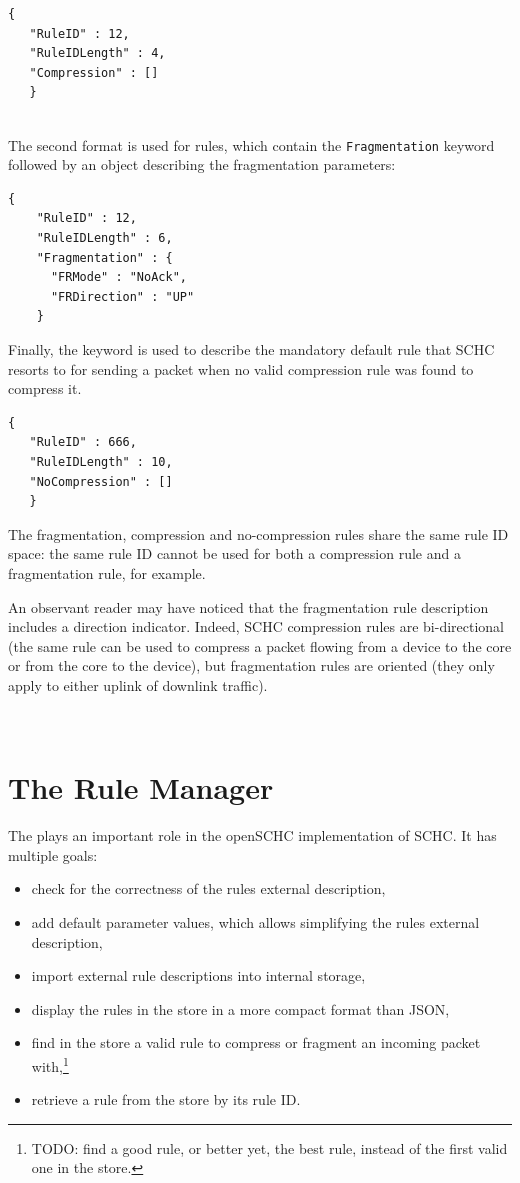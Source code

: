 \begin{lstlisting}[backgroundcolor=\color{yellow}]
   {
   "RuleID" : 12,
   "RuleIDLength" : 4,
   "Compression" : []
   }
   
\end{lstlisting}

The second format is used for  rules, which contain the \texttt{Fragmentation} keyword followed by an object describing the fragmentation parameters:

\begin{lstlisting}[backgroundcolor=\color{yellow}]
    {
    "RuleID" : 12,
    "RuleIDLength" : 6,
    "Fragmentation" : {
      "FRMode" : "NoAck",
      "FRDirection" : "UP"
    }
\end{lstlisting}

Finally, the  keyword is used to describe the mandatory default rule that SCHC resorts to for sending a packet when no valid compression rule was found to compress it.


\begin{lstlisting}[backgroundcolor=\color{yellow}]
   {
   "RuleID" : 666,
   "RuleIDLength" : 10,
   "NoCompression" : []
   }
\end{lstlisting}

The fragmentation, compression and no-compression rules share the same rule ID space: the same rule ID cannot be used for both a compression rule and a fragmentation rule, for example. 

An observant reader may have noticed that the fragmentation rule description includes a direction indicator. 
Indeed, SCHC compression rules are bi-directional (the same rule can be used to compress a packet flowing from a device to the core or from the core to the device), but fragmentation rules are oriented (they only apply to either uplink of downlink traffic).  

~



\section{The Rule Manager}

The  plays an important role in the openSCHC implementation of SCHC. It has multiple goals:
\begin{itemize}
    \item check for the correctness of the rules external description,
    \item add default parameter values, which allows simplifying the rules external description,
    \item import external rule descriptions into internal storage,
    \item display the rules in the  store in a more compact format than JSON,
    \item find in the store a valid rule to compress or fragment an incoming packet with,\footnote{TODO: find a good rule, or better yet, the best rule, instead of the first valid one in the store.}
    \item retrieve a rule from the store by its rule ID.
\end{itemize}

